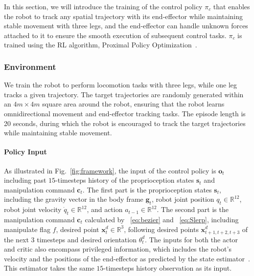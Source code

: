 \label{sec:control}
In this section, we will introduce the training of the control policy $\pi_{c}$ that enables the robot to track any spatial trajectory with its end-effector while maintaining stable movement with three legs, and the end-effector can handle unknown forces attached to it to ensure the smooth execution of subsequent control tasks. $\pi_{c}$ is trained using the RL algorithm, Proximal Policy Optimization~\cite{schulman2017proximal}.

\subsubsection{Environment}
We train the robot to perform locomotion tasks with three legs, while one leg tracks a given trajectory. The target trajectories are randomly generated within an  $4m\times4m$ square area around the robot, ensuring that the robot learns omnidirectional movement and end-effector tracking tasks. The episode length is 20 seconds, during which the robot is encouraged to track the target trajectories while maintaining stable movement.

\paragraph{Policy Input}
As illustrated in Fig.~\ref{fig:framework}, the input of the control policy is $\mathbf{o}_t$ including past $15$-timesteps history of the proprioception states $\mathbf{s}_t$ and manipulation command $\mathbf{c}_t$. %
The first part is the proprioception states $\mathbf{s}_t$, including the gravity vector in the body frame $\mathbf{g}_{t}$, robot joint position $q_t \in \mathbb{R}^{12}$, robot joint velocity $\dot{q}_t \in \mathbb{R}^{12}$, and action $a_{t-1} \in \mathbb{R}^{12}$.
The second part is the manipulation command $\mathbf{c}_t$ calculated by ~\eqref{eq:bezier} and ~\eqref{eq:Slerp}, including manipulate flag $f$, desired point $\mathbf{x}_t^d \in \mathbb{R}^{3}$, following desired points $\mathbf{x}_{t+1,t+2,t+3}^d$ of the next $3$ timesteps and desired orientation $\theta_t^d$. 
The inputs for both the actor and critic also encompass privileged information, which includes the robot's velocity and the positions of the end-effector as predicted by the state estimator~\cite{estimator}. This estimator takes the same $15$-timesteps history observation as its input.

